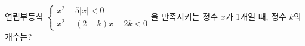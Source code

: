 연립부등식 $\begin{cases} x^2-5|x|<0 \\ x^2+(2-k)x-2k<0 \end{cases}$을 만족시키는 정수 $x$가 1개일 때, 정수 $k$의 개수는? 
